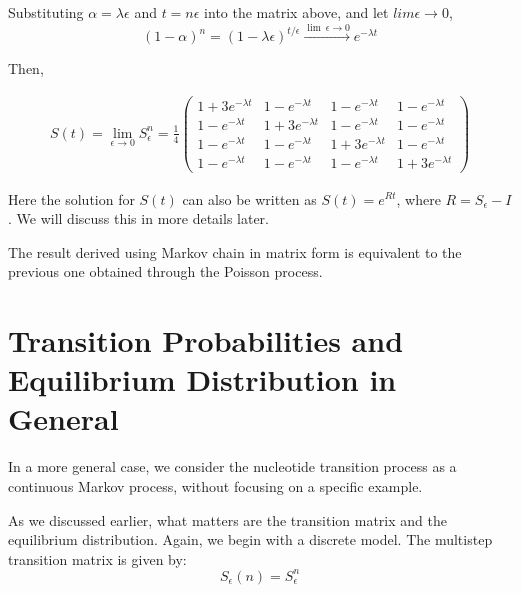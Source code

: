 \documentclass[12pt]{book}
\begin{document}
        Substituting $\alpha = \lambda \epsilon$ and $t = n \epsilon$ into the matrix above, and let $lim \epsilon \rightarrow 0$,
        \begin{equation*}
            (1-\alpha)^n = (1-\lambda \epsilon)^{t/\epsilon} \stackrel{\lim\ \epsilon \rightarrow 0}{\longrightarrow} e ^{- \lambda t}
        \end{equation*}

        Then,

        \begin{align*}
            S(t)= \lim_{\epsilon \rightarrow 0} S_{\epsilon}^n = \frac{1}{4}\left(
                \begin{matrix}
                1 + 3 e ^{- \lambda t} & 1 - e ^{- \lambda t} & 1 - e ^{- \lambda t} & 1 - e ^{- \lambda t} \\
                1 - e ^{- \lambda t} & 1 + 3 e ^{- \lambda t} & 1 - e ^{- \lambda t} & 1 - e ^{- \lambda t} \\
                1 - e ^{- \lambda t} & 1 - e ^{- \lambda t} & 1 + 3 e ^{- \lambda t} & 1 - e ^{- \lambda t} \\
                1 - e ^{- \lambda t} & 1 - e ^{- \lambda t} & 1 - e ^{- \lambda t} & 1 + 3 e ^{- \lambda t}
                \end{matrix}
            \right)
        \end{align*}

        Here the solution for $S(t)$ can also be written as $S(t) = e ^{Rt}$, where $R = S_{\epsilon} - I$. We will discuss this in more details later.

        The result derived using Markov chain in matrix form is equivalent to the previous one obtained through the Poisson process.

    \section{Transition Probabilities and Equilibrium Distribution in General}

        In a more general case, we consider the nucleotide transition process as a continuous Markov process, without focusing on a specific example.
        
        As we discussed earlier, what matters are the transition matrix and the equilibrium distribution. Again, we begin with a discrete model. The multistep transition matrix is given by:
        \begin{equation} \label{eq:\thesection:Multi_transition_matrix}
            S_{\epsilon}(n) = S_{\epsilon}^n
        \end{equation}
\end{document}

